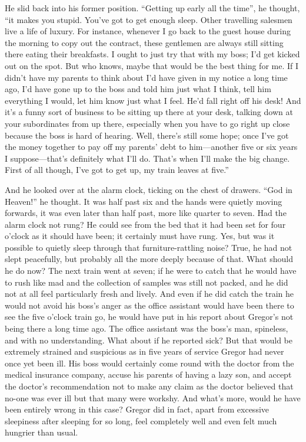 He slid back into his former position. “Getting up early all the time”,
he thought, “it makes you stupid. You’ve got to get enough sleep. Other
travelling salesmen live a life of luxury. For instance, whenever I go
back to the guest house during the morning to copy out the contract,
these gentlemen are always still sitting there eating their breakfasts.
I ought to just try that with my boss; I’d get kicked out on the spot.
But who knows, maybe that would be the best thing for me. If I didn’t
have my parents to think about I’d have given in my notice a long time
ago, I’d have gone up to the boss and told him just what I think, tell
him everything I would, let him know just what I feel. He’d fall right
off his desk! And it’s a funny sort of business to be sitting up there
at your desk, talking down at your subordinates from up there,
especially when you have to go right up close because the boss is hard
of hearing. Well, there’s still some hope; once I’ve got the money
together to pay off my parents’ debt to him—another five or six years I
suppose—that’s definitely what I’ll do. That’s when I’ll make the big
change. First of all though, I’ve got to get up, my train leaves at
five.”

And he looked over at the alarm clock, ticking on the chest of drawers.
“God in Heaven!” he thought. It was half past six and the hands were
quietly moving forwards, it was even later than half past, more like
quarter to seven. Had the alarm clock not rung? He could see from the
bed that it had been set for four o’clock as it should have been; it
certainly must have rung. Yes, but was it possible to quietly sleep
through that furniture-rattling noise? True, he had not slept
peacefully, but probably all the more deeply because of that. What
should he do now? The next train went at seven; if he were to catch
that he would have to rush like mad and the collection of samples was
still not packed, and he did not at all feel particularly fresh and
lively. And even if he did catch the train he would not avoid his
boss’s anger as the office assistant would have been there to see the
five o’clock train go, he would have put in his report about Gregor’s
not being there a long time ago. The office assistant was the boss’s
man, spineless, and with no understanding. What about if he reported
sick? But that would be extremely strained and suspicious as in five
years of service Gregor had never once yet been ill. His boss would
certainly come round with the doctor from the medical insurance
company, accuse his parents of having a lazy son, and accept the
doctor’s recommendation not to make any claim as the doctor believed
that no-one was ever ill but that many were workshy. And what’s more,
would he have been entirely wrong in this case? Gregor did in fact,
apart from excessive sleepiness after sleeping for so long, feel
completely well and even felt much hungrier than usual.

